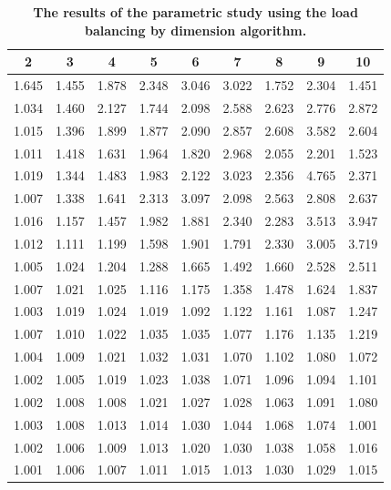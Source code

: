 \documentclass[letterpaper]{mandc2019}
\begin{document}
{\begin{table}[htb]
\centering
  \caption{\bf The results of the parametric study using the load balancing by dimension algorithm.}
  \begin{tabular}{c|c|c|c|c|c|c|c|c} 
  \bf  2 & \bf 3    &  \bf  4   &  \bf  5   &  \bf 6    &  \bf  7   &   \bf 8   &  \bf 9    &  \bf 10   \\ \hline \hline
1.645 & 1.455 & 1.878 & 2.348 & 3.046 & 3.022 & 1.752 & 2.304 & 1.451 \\ \hline 
1.034 & 1.460 & 2.127 & 1.744 & 2.098 & 2.588 & 2.623 & 2.776 & 2.872 \\ \hline
1.015 & 1.396 & 1.899 & 1.877 & 2.090 & 2.857 & 2.608 & 3.582 & 2.604 \\ \hline
1.011 & 1.418 & 1.631 & 1.964 & 1.820 & 2.968 & 2.055 & 2.201 & 1.523 \\ \hline
1.019 & 1.344 & 1.483 & 1.983 & 2.122 & 3.023 & 2.356 & \cellcolor{blue!25}4.765 & 2.371 \\ \hline
1.007 & 1.338 & 1.641 & 2.313 & 3.097 & 2.098 & 2.563 & 2.808 & 2.637 \\ \hline
1.016 & 1.157 & 1.457 & 1.982 & 1.881 & 2.340 & 2.283 & 3.513 & 3.947 \\ \hline
1.012 & 1.111 & 1.199 & 1.598 & 1.901 & 1.791 & 2.330 & 3.005 & 3.719 \\ \hline
1.005 & 1.024 & 1.204 & 1.288 & 1.665 & 1.492 & 1.660 & 2.528 & 2.511 \\ \hline
1.007 & 1.021 & 1.025 & 1.116 & 1.175 & 1.358 & 1.478 & 1.624 & 1.837 \\ \hline
1.003 & 1.019 & 1.024 & 1.019 & 1.092 & 1.122 & 1.161 & 1.087 & 1.247 \\ \hline
1.007 & 1.010 & 1.022 & 1.035 & 1.035 & 1.077 & 1.176 & 1.135 & 1.219 \\ \hline
1.004 & 1.009 & 1.021 & 1.032 & 1.031 & 1.070 & 1.102 & 1.080 & 1.072 \\ \hline
1.002 & 1.005 & 1.019 & 1.023 & 1.038 & 1.071 & 1.096 & 1.094 & 1.101 \\ \hline
1.002 & 1.008 & 1.008 & 1.021 & 1.027 & 1.028 & 1.063 & 1.091 & 1.080 \\ \hline
1.003 & 1.008 & 1.013 & 1.014 & 1.030 & 1.044 & 1.068 & 1.074 & \cellcolor{red!25}1.001 \\ \hline
1.002 & 1.006 & 1.009 & 1.013 & 1.020 & 1.030 & 1.038 & 1.058 & 1.016 \\ \hline
\cellcolor{red!25}1.001 & 1.006 & 1.007 & 1.011 & 1.015 & 1.013 & 1.030 & 1.029 & 1.015 \\ \hline


\end{tabular}
\end{table}}
\end{document}
